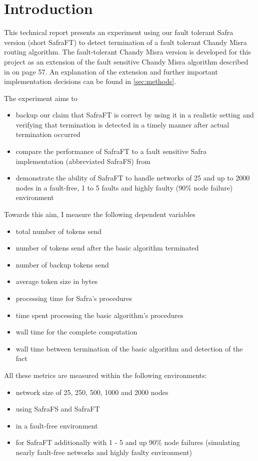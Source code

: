 \section{Introduction} 
This technical report presents an experiment using our fault tolerant Safra version (short SafraFT) \cite{ourpaper}
to detect termination of a fault tolerant Chandy Misra routing algorithm.
The fault-tolerant Chandy Misra version is developed for this project as an extension of the fault sensitive Chandy Misra algorithm described in \cite{Fokkink:2018} on page 57.
An explanation of the extension and further important implementation decisions can be found in \cref{sec:methods}.

The experiment aims to
\begin{itemize}
	\item backup our claim that SafraFT is correct by using it in a realistic setting and verifying that termination is detected in a timely manner after actual termination occurred
	\item compare the performance of SafraFT to a fault sensitive Safra implementation (abbreviated SafraFS) from \cite{demirbas2000optimal}
	\item demonstrate the ability of SafraFT to handle networks of 25 and up to 2000 nodes in a fault-free, 1 to 5 faults and highly faulty (90\% node failure) environment
\end{itemize}

Towards this aim, I measure the following dependent variables
\begin{itemize}
	\item total number of tokens send
	\item number of tokens send after the basic algorithm terminated
	\item number of backup tokens send
	\item average token size in bytes
	\item processing time for Safra's procedures
	\item time spent processing the basic algorithm's procedures 
	\item wall time for the complete computation
	\item wall time  between termination of the basic algorithm and detection of the fact
\end{itemize} 

All these metrics are measured within the following environments:
\begin{itemize}
	\item network size of 25, 250, 500, 1000 and 2000 nodes
	\item using SafraFS and SafraFT
	\item in a fault-free environment
	\item for SafraFT additionally with 1 - 5 and up 90\% node failures (simulating nearly fault-free networks and highly faulty environment)
\end{itemize}

